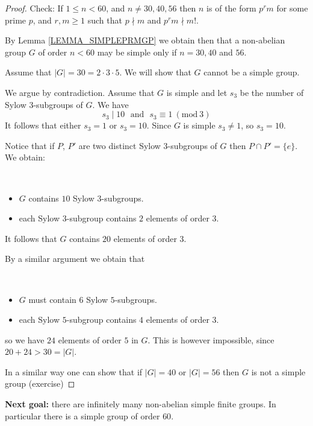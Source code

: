 \documentclass[12pt, letterpaper, oneside]{article}
\theoremstyle{plain}
\theoremstyle{definition}
\newcommand{\bit}{\begin{itemize}}
\newcommand{\eit}{\end{itemize}}
\newcommand{\isep}[1][0]{\setlength{\itemsep}{#1 mm}}
\begin{document}
\begin{proof}
Check: If $1\leq n < 60$, and $n\neq 30, 40, 56$ then $n$ is of the form $p^{r}m$
for some prime $p$, and $r, m \geq 1$ such that $p\nmid m$ and $p^{r}m \nmid m!$. 

By Lemma \ref{LEMMA_SIMPLEPRMGP}   we obtain then that a non-abelian group $G$  
of order $n< 60$ may be simple only if $n=30, 40$ and $56$. 

Assume that $|G| = 30 = 2\cdot 3 \cdot 5$. We will show that $G$ cannot be a simple group.

We argue by contradiction. Assume that $G$ is simple and 
let $s_{3}$ be the number of Sylow $3$-subgroups of $G$. We have
$$s_{3} \mid 10 \ \ \ \text{and} \ \ \ s_{3} \equiv 1 \ (\mathrm{mod} \ 3)$$
It follows that either $s_{3} = 1$ or $s_{3}=10$. Since $G$ is simple $s_{3}\neq 1$, so 
$s_{3} = 10$. 

Notice that if $P$, $P'$ are two distinct Sylow $3$-subgroups of $G$ then $P\cap P' = \{e\}$. 
We obtain:

\vskip -13mm

\ 
\bit
\isep
\item[--] $G$ contains $10$ Sylow $3$-subgroups. 
\item[--] each Sylow $3$-subgroup contains $2$ elements of order $3$.
\eit
 
It follows that $G$ contains $20$ elements of order $3$. 

By a similar argument we obtain that 
\vskip -13mm

\ 
\bit
\isep
\item[--] $G$ must contain $6$ Sylow $5$-subgroups. 
\item[--] each Sylow $5$-subgroup contains $4$ elements of order $3$.
\eit
so we have $24$ elements of order $5$ in $G$. 
This is however impossible, since $20 + 24  > 30 = |G|$.



In a similar way one can show that if $|G| = 40$ or $|G|=56$ then $G$ is not
a simple group (exercise)
\end{proof}


\textbf{Next goal:} there are infinitely many  non-abelian simple finite groups. 
In particular there is a simple group of order $60$. 




\end{document}
